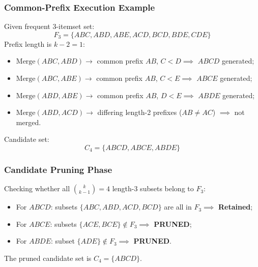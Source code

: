 \subsubsection{Common-Prefix Execution Example}
Given frequent 3-itemset set:
\begin{equation}
F_3 = \{ABC, ABD, ABE, ACD, BCD, BDE, CDE\}
\end{equation}
Prefix length is $k-2 = 1$:
\begin{itemize}[noitemsep]
    \item $\mathrm{Merge}(ABC, ABD) \rightarrow$ common prefix $AB$, $C < D \implies$ \textbf{$ABCD$} generated;
    \item $\mathrm{Merge}(ABC, ABE) \rightarrow$ common prefix $AB$, $C < E \implies$ \textbf{$ABCE$} generated;
    \item $\mathrm{Merge}(ABD, ABE) \rightarrow$ common prefix $AB$, $D < E \implies$ \textbf{$ABDE$} generated;
    \item $\mathrm{Merge}(ABD, ACD) \rightarrow$ differing length-2 prefixes ($AB \ne AC$) $\implies$ not merged.
\end{itemize}
Candidate set:
\begin{equation}
C_4 = \{ABCD, ABCE, ABDE\}
\end{equation}

\subsubsection{Candidate Pruning Phase}
Checking whether all $\binom{k}{k-1} = 4$ length-3 subsets belong to $F_3$:
\begin{itemize}[noitemsep]
    \item For $ABCD$: subsets $\{ABC, ABD, ACD, BCD\}$ are all in $F_3 \implies$ \textbf{Retained};
    \item For $ABCE$: subsets $\{ACE, BCE\} \notin F_3 \implies$ \textbf{PRUNED};
    \item For $ABDE$: subset $\{ADE\} \notin F_3 \implies$ \textbf{PRUNED}.
\end{itemize}
The pruned candidate set is $C_4 = \{ABCD\}$.

